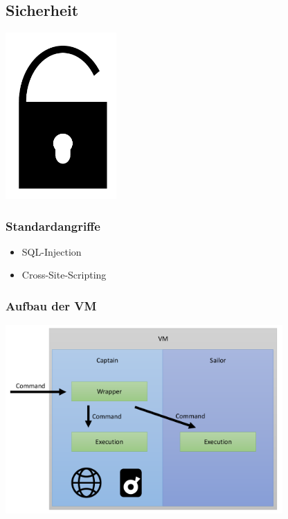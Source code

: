 \subsection{Sicherheit}

\begin{frame}
\begin{center}
\includegraphics[width=120pt]{security/lock.pdf}
\end{center}
\end{frame}

\begin{frame}
\frametitle{Standardangriffe}
\begin{itemize}
\item[] SQL-Injection
\item[] Cross-Site-Scripting
\end{itemize}
\end{frame}

\begin{frame}
\frametitle{Aufbau der VM}
\includegraphics[width=300pt]{security/user.pdf}
\end{frame}